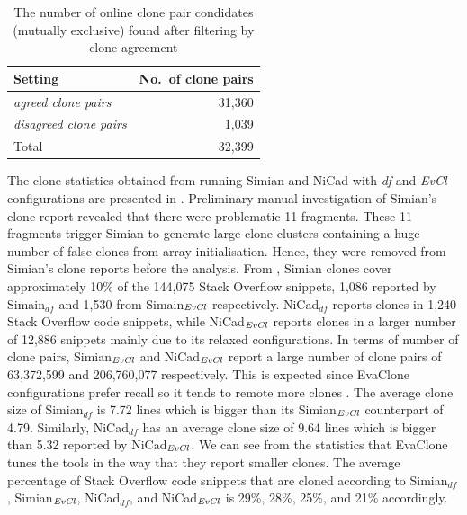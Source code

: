 \documentclass{sig-alternate-05-2015}
\begin{document}
\begin{table}
	\centering
	\caption{The number of online clone pair condidates (mutually exclusive) found after filtering by clone agreement}
	\label{tab:online_clone_pairs}
	\small
	\begin{tabular}{l|r}
		\hline
		Setting & No.~of clone pairs \\ 
		\hline 
		\multirow{1}{*}{\textit{agreed clone pairs}}        & 31,360 \\
		\multirow{1}{*}{\textit{disagreed clone pairs}}    & 1,039 \\
		\hline
		Total                                               & 32,399 \\ 
		\hline
	\end{tabular} 
\end{table}

The clone statistics obtained from running Simian and NiCad with \textit{df} and \textit{EvCl} configurations are presented in . Preliminary manual investigation of Simian's clone report revealed that there were problematic 11 fragments. These 11 fragments trigger Simian to generate large clone clusters containing a huge number of false clones from array initialisation. Hence, they were removed from Simian's clone reports before the analysis. From , Simian clones cover approximately 10\% of the 144,075 Stack Overflow snippets, 1,086 reported by Simain$_{df}$ and 1,530 from Simain$_{\textrm{\textit{EvCl}}}$ respectively. NiCad$_{df}$ reports clones in 1,240 Stack Overflow code snippets, while NiCad$_{\textrm{\textit{EvCl}}}$ reports clones in a larger number of 12,886 snippets  mainly due to its relaxed configurations. In terms of number of clone pairs, Simian$_{\textrm{\textit{EvCl}}}$ and NiCad$_{\textrm{\textit{EvCl}}}$ report a large number of clone pairs of 63,372,599 and 206,760,077 respectively. This is expected since EvaClone configurations prefer recall so it tends to remote more clones \cite{Wang2013}. The average clone size of Simian$_{df}$ is 7.72 lines which is bigger than its Simian$_{\textrm{\textit{EvCl}}}$ counterpart of 4.79. Similarly, NiCad$_{df}$ has an average clone size of 9.64 lines which is bigger than 5.32 reported by NiCad$_{\textrm{\textit{EvCl}}}$. We can see from the statistics that EvaClone tunes the tools in the way that they report smaller clones. The average percentage of Stack Overflow code snippets that are cloned according to Simian$_{df}$, Simian$_{\textrm{\textit{EvCl}}}$, NiCad$_{df}$, and NiCad$_{\textrm{\textit{EvCl}}}$ is 29\%, 28\%, 25\%, and 21\% accordingly.
\end{document}
